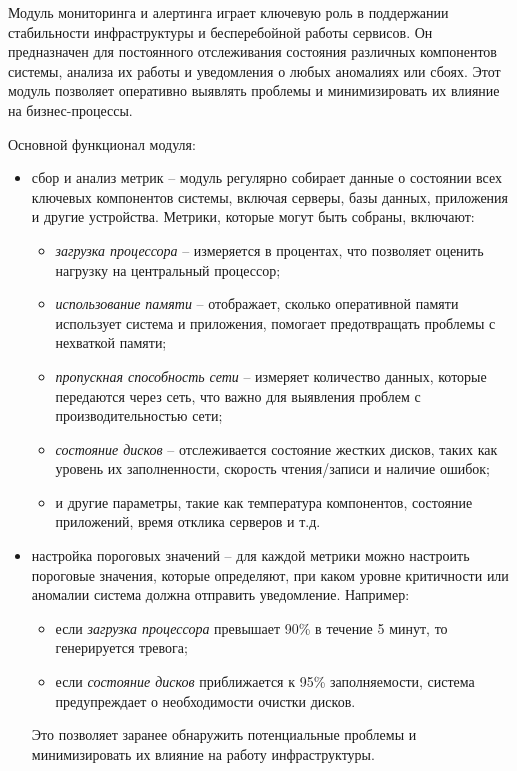 Модуль мониторинга и алертинга играет ключевую роль в поддержании стабильности инфраструктуры и бесперебойной работы сервисов. Он предназначен для постоянного отслеживания состояния различных компонентов системы, анализа их работы и уведомления о любых аномалиях или сбоях. Этот модуль позволяет оперативно выявлять проблемы и минимизировать их влияние на бизнес-процессы.

Основной функционал модуля:

\begin{itemize}
    \item сбор и анализ метрик -- модуль регулярно собирает данные о состоянии всех ключевых компонентов системы, включая серверы, базы данных, приложения и другие устройства. Метрики, которые могут быть собраны, включают:
    \begin{itemize}
        \item \textit{загрузка процессора} -- измеряется в процентах, что позволяет оценить нагрузку на центральный процессор;
        \item \textit{использование памяти} -- отображает, сколько оперативной памяти использует система и приложения, помогает предотвращать проблемы с нехваткой памяти;
        \item \textit{пропускная способность сети} -- измеряет количество данных, которые передаются через сеть, что важно для выявления проблем с производительностью сети;
        \item \textit{состояние дисков} -- отслеживается состояние жестких дисков, таких как уровень их заполненности, скорость чтения/записи и наличие ошибок;
        \item и другие параметры, такие как температура компонентов, состояние приложений, время отклика серверов и т.д.
    \end{itemize}
    \item настройка пороговых значений -- для каждой метрики можно настроить пороговые значения, которые определяют, при каком уровне критичности или аномалии система должна отправить уведомление. Например:
    \begin{itemize}
        \item если \textit{загрузка процессора} превышает 90\% в течение 5 минут, то генерируется тревога;
        \item если \textit{состояние дисков} приближается к 95\% заполняемости, система предупреждает о необходимости очистки дисков.
    \end{itemize}
    Это позволяет заранее обнаружить потенциальные проблемы и минимизировать их влияние на работу инфраструктуры.

\end{itemize}
